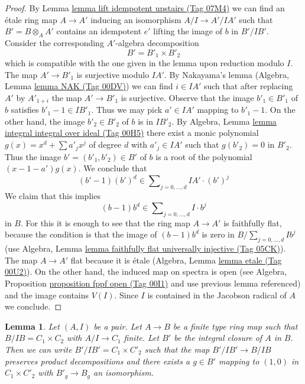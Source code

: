 \documentclass{amsart}
\theoremstyle{plain}
\newtheorem{lemma}[subsection]{Lemma}
\theoremstyle{definition}
\theoremstyle{remark}
\numberwithin{equation}{subsection}
\begin{document}
\begin{proof}
By Lemma \href{https://stacks.math.columbia.edu/tag/07M4}{lemma lift idempotent upstairs (Tag 07M4)} we can find an
\'etale ring map $A \to A'$ inducing an isomorphism $A/I \to A'/IA'$
such that $B' = B \otimes_A A'$ contains
an idempotent $e'$ lifting the image of $b$ in $B'/IB'$.
Consider the corresponding $A'$-algebra decomposition
$$
B' = B'_1 \times B'_2
$$
which is compatible with the one given in the lemma upon
reduction modulo $I$.
The map $A' \to B'_1$ is surjective modulo $IA'$. By Nakayama's lemma
(Algebra, Lemma \href{https://stacks.math.columbia.edu/tag/00DV}{lemma NAK (Tag 00DV)})
we can find $i \in IA'$ such that after replacing $A'$
by $A'_{1 + i}$ the map $A' \to B'_1$ is surjective.
Observe that the image $b'_1 \in B'_1$ of $b$ 
satisfies $b'_1 - 1 \in IB'_1$.
Thus we may pick $a' \in IA'$ mapping to $b'_1 - 1$.
On the other hand, the image $b'_2 \in B'_2$ of $b$ is in $IB'_2$. By
Algebra, Lemma \href{https://stacks.math.columbia.edu/tag/00H5}{lemma integral integral over ideal (Tag 00H5)}
there exist a monic polynomial
$g(x) = x^d + \sum a'_j x^j$ of degree $d$ with $a'_j \in IA'$ such that
$g(b'_2) = 0$ in $B'_2$. Thus the image $b' = (b'_1, b'_2) \in B'$
of $b$ is a root of the polynomial $(x - 1 - a')g(x)$. We conclude that
$$
(b' - 1)(b')^d \in \sum\nolimits_{j = 0, \ldots, d} IA' \cdot (b')^j
$$
We claim that this implies
$$
(b - 1)b^d \in \sum\nolimits_{j = 0, \ldots, d} I \cdot b^j
$$
in $B$. For this it is enough to see that the ring map
$A \to A'$ is faithfully flat, because the condition is that
the image of $(b - 1)b^d$ is zero in $B/\sum_{j = 0, \ldots, d} Ib^j$
(use Algebra, Lemma \href{https://stacks.math.columbia.edu/tag/05CK}{lemma faithfully flat universally injective (Tag 05CK)}).
The map $A \to A'$ flat because it is \'etale
(Algebra, Lemma \href{https://stacks.math.columbia.edu/tag/00U2}{lemma etale (Tag 00U2)}).
On the other hand, the induced map on spectra is open
(see Algebra, Proposition \href{https://stacks.math.columbia.edu/tag/00I1}{proposition fppf open (Tag 00I1)} and use
previous lemma referenced) and the image
contains $V(I)$. Since $I$ is contained in the Jacobson radical of $A$
we conclude.
\end{proof}


\begin{lemma}
\label{lemma-helper-finite-type}
Let $(A, I)$ be a pair. Let $A \to B$ be a finite type ring map
such that $B/IB = C_1 \times C_2$ with $A/I \to C_1$ finite.
Let $B'$ be the integral closure of $A$ in $B$.
Then we can write $B'/IB' = C_1 \times C'_2$ such that
the map $B'/IB' \to B/IB$ preserves product decompositions
and there exists a $g \in B'$ mapping to $(1, 0)$ in
$C_1 \times C'_2$ with $B'_g \to B_g$ an isomorphism.
\end{lemma}
\end{document}
